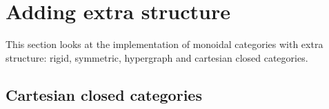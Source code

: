 
\section{Adding extra structure} \label{section:extra structure}

This section looks at the implementation of monoidal categories with extra structure: rigid, symmetric, hypergraph and cartesian closed categories.





\subsection{Cartesian closed categories}
